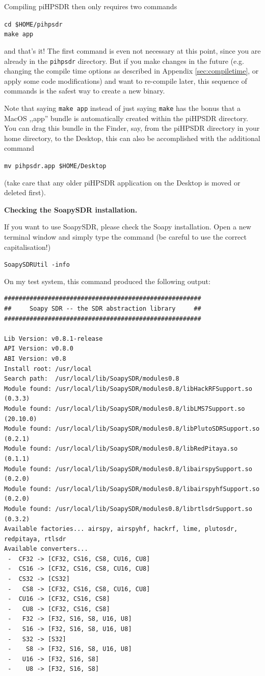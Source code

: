\documentclass[12pt]{book}
\def\grtt#1{\texttt{\color{magenta}#1}}
\def\pH{pi\-HPSDR\xspace}
\begin{document}
Compiling \pH then only requires two commands

\grtt{cd \$HOME/pihpsdr} \\
\grtt{make app}

and that's it! The first command is even not necessary at this point,
since you are already in the \texttt{pihpsdr}  directory.
But if you make changes in the future (e.g. changing the compile time options as described in
Appendix \ref{sec:compiletime}, or apply some code modifications)
and want to re-compile later, this sequence of commands is the safest way to create a new binary.

Note that saying \texttt{make app} instead of just saying \texttt{make} has the bonus
that a MacOS ,,app'' bundle is automatically created within the \pH directory.
You can drag this bundle in the Finder, say, from the \pH directory in your
home directory, to the Desktop, this can also be accomplished with the additional command

\grtt{mv pihpsdr.app \$HOME/Desktop}

(take care that any older \pH application on the Desktop is moved or deleted first).

\clearpage
\textbf{Checking the SoapySDR installation.}

If you want to use SoapySDR, please check the Soapy installation.
Open a new terminal window and simply
type the command (be careful to use the correct capitalisation!)

\grtt{SoapySDRUtil -info}

On my test system, this command produced the following output:

\begin{tiny}
\begin{verbatim}
######################################################
##     Soapy SDR -- the SDR abstraction library     ##
######################################################

Lib Version: v0.8.1-release
API Version: v0.8.0
ABI Version: v0.8
Install root: /usr/local
Search path:  /usr/local/lib/SoapySDR/modules0.8
Module found: /usr/local/lib/SoapySDR/modules0.8/libHackRFSupport.so   (0.3.3)
Module found: /usr/local/lib/SoapySDR/modules0.8/libLMS7Support.so     (20.10.0)
Module found: /usr/local/lib/SoapySDR/modules0.8/libPlutoSDRSupport.so (0.2.1)
Module found: /usr/local/lib/SoapySDR/modules0.8/libRedPitaya.so       (0.1.1)
Module found: /usr/local/lib/SoapySDR/modules0.8/libairspySupport.so   (0.2.0)
Module found: /usr/local/lib/SoapySDR/modules0.8/libairspyhfSupport.so (0.2.0)
Module found: /usr/local/lib/SoapySDR/modules0.8/librtlsdrSupport.so   (0.3.2)
Available factories... airspy, airspyhf, hackrf, lime, plutosdr, redpitaya, rtlsdr
Available converters...
 -  CF32 -> [CF32, CS16, CS8, CU16, CU8]
 -  CS16 -> [CF32, CS16, CS8, CU16, CU8]
 -  CS32 -> [CS32]
 -   CS8 -> [CF32, CS16, CS8, CU16, CU8]
 -  CU16 -> [CF32, CS16, CS8]
 -   CU8 -> [CF32, CS16, CS8]
 -   F32 -> [F32, S16, S8, U16, U8]
 -   S16 -> [F32, S16, S8, U16, U8]
 -   S32 -> [S32]
 -    S8 -> [F32, S16, S8, U16, U8]
 -   U16 -> [F32, S16, S8]
 -    U8 -> [F32, S16, S8]
\end{verbatim}
\end{tiny}
\end{document}
